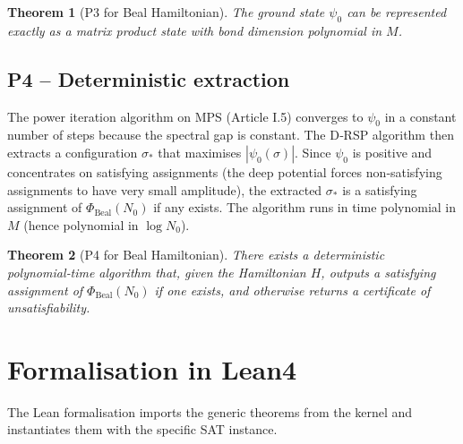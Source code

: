 \documentclass[11pt,a4paper]{article}
\newtheorem{theorem}{Theorem}[section]
\begin{document}
\begin{theorem}[P3 for Beal Hamiltonian]
The ground state \(\psi_0\) can be represented exactly as a matrix product state with bond dimension polynomial in \(M\).
\end{theorem}

\subsection{P4 – Deterministic extraction}

The power iteration algorithm on MPS (Article I.5) converges to \(\psi_0\) in a constant number of steps because the spectral gap is constant. The D‑RSP algorithm then extracts a configuration \(\sigma_{*}\) that maximises \(|\psi_0(\sigma)|\). Since \(\psi_0\) is positive and concentrates on satisfying assignments (the deep potential forces non‑satisfying assignments to have very small amplitude), the extracted \(\sigma_{*}\) is a satisfying assignment of \(\Phi_{\text{Beal}}(N_0)\) if any exists. The algorithm runs in time polynomial in \(M\) (hence polynomial in \(\log N_0\)).

\begin{theorem}[P4 for Beal Hamiltonian]
There exists a deterministic polynomial‑time algorithm that, given the Hamiltonian \(H\), outputs a satisfying assignment of \(\Phi_{\text{Beal}}(N_0)\) if one exists, and otherwise returns a certificate of unsatisfiability.
\end{theorem}

\section{Formalisation in Lean4}

The Lean formalisation imports the generic theorems from the kernel and instantiates them with the specific SAT instance.
\end{document}
